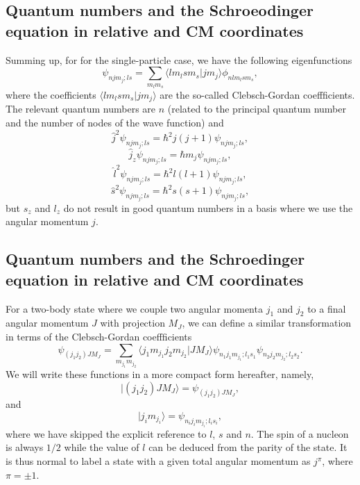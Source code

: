 \documentclass[%
twoside,                 %
final,                   %
10pt]{article}
\begin{document}
\subsection{Quantum numbers and the Schroeodinger equation in relative and CM coordinates}
\begin{block}{}
Summing up, for 
for the single-particle case, we have the following eigenfunctions 
\[
\psi_{njm_j;ls}=\sum_{m_lm_s}\langle lm_lsm_s|jm_j\rangle\phi_{nlm_lsm_s},
\]
where the coefficients $\langle lm_lsm_s|jm_j\rangle$ are the so-called Clebsch-Gordan coeffficients.
The relevant quantum numbers are $n$ (related to the principal quantum number and the number of nodes of the wave function) and 
\[
   \hat{j}^2\psi_{njm_j;ls}=\hbar^2j(j+1)\psi_{njm_j;ls},
\]
\[
   \hat{j}_z\psi_{njm_j;ls}=\hbar m_j\psi_{njm_j;ls},
\]
\[
   \hat{l}^2\psi_{njm_j;ls}=\hbar^2l(l+1)\psi_{njm_j;ls},
\]
\[
   \hat{s}^2\psi_{njm_j;ls}=\hbar^2s(s+1)\psi_{njm_j;ls},
\]
but $s_z$ and $l_z$ do not result in good quantum numbers in a basis where we
use the angular momentum $j$.
\end{block}

\subsection{Quantum numbers and the Schroedinger equation in relative and CM coordinates}
\begin{block}{}
For a two-body state where we couple two angular momenta $j_1$ and $j_2$ to a final
angular momentum $J$ with projection $M_J$, we can define a similar transformation in terms
of the Clebsch-Gordan coeffficients
\[
\psi_{(j_1j_2)JM_J}=\sum_{m_{j_1}m_{j_2}}\langle j_1m_{j_1}j_2m_{j_2}|JM_J\rangle\psi_{n_1j_1m_{j_1};l_1s_1}\psi_{n_2j_2m_{j_2};l_2s_2}.
\]
We will write these functions in a more compact form hereafter, namely,
\[
|(j_1j_2)JM_J\rangle=\psi_{(j_1j_2)JM_J},
\]
and
\[
|j_im_{j_i}\rangle=\psi_{n_ij_im_{j_i};l_is_i},
\]
where we have skipped the explicit reference to $l$, $s$ and $n$. The spin of a nucleon is always $1/2$ while the value of $l$ can be deduced from the parity of the state.
It is thus normal to label a state with a given total angular momentum as 
$j^{\pi}$, where $\pi=\pm 1$. 
\end{block}

\end{document}
